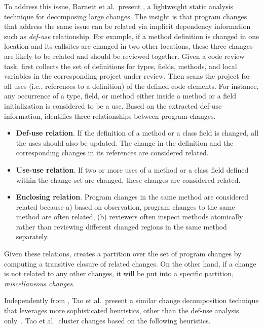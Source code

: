 \documentclass[runningheads,a4paper]{llncs}
\begin{document}

To address this issue, Barnett et al.~present {\clusterchanges}, a lightweight static analysis technique for decomposing large changes. The insight is that program changes that address the same issue can be related via implicit dependency information such as {\em def-use} relationship. For example, if a method definition is changed in one location and its callsites are changed in two other locations, these three changes are likely to be related and should be reviewed together. Given a code review task, {\clusterchanges} first collects the set of definitions for types, fields, methods, and local variables in the corresponding project under review. Then {\clusterchanges} scans the project for all uses (i.e., references to a definition) of the defined code elements. For instance, any occurrence of a type, field, or method either inside a method or a field initialization is considered to be a use. Based on the extracted def-use information, {\clusterchanges} identifies three relationships between program changes. 

\begin{itemize}
 \item {\bf Def-use relation}. If the definition of a method or a class field is changed, all the uses should also be updated. The change in the definition and the corresponding changes in its references are considered related.
 \item {\bf Use-use relation}. If two or more uses of a method or a class field defined within the change-set are changed, these changes are considered related. 
 \item {\bf Enclosing relation}. Program changes in the same method are considered related because a) based on observation, program changes to the same method are often related, (b) reviewers often inspect methods atomically rather than reviewing different changed regions in the same method separately.
\end{itemize}

Given these relations, {\clusterchanges} creates a partition over the set of program changes by computing a transitive closure of related changes. On the other hand, if a change is not related to any other changes, it will be put into a specific partition, {\em miscellaneous changes}.

Independently from {\clusterchanges}, Tao et al.~present a similar change decomposition technique that leverages more sophisticated heuristics, other than the def-use analysis only~\cite{tao2015partitioning}. Tao et al.~cluster changes based on the following heuristics.
\end{document}
